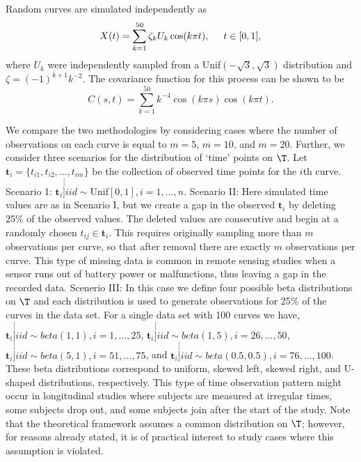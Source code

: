 Random curves are simulated independently as
\begin{equation}
X(t) = \sum^{50}_{k=1}\zeta_k U_k \cos(k\pi t), \hspace{0.5cm} t \in [0,1],
\label{eq:sim process}
\end{equation}
where $U_k$ were independently sampled from a Unif$(-\sqrt{3},\sqrt{3})$ distribution and \(\zeta=(-1)^{k+1}k^{-2}\). 
The covariance function for this process can be shown to be
\begin{equation*}
C(s,t) = \sum^{50}_{k=1}k^{-4} \cos(k\pi s)\cos(k\pi t). 
\end{equation*}

We compare the two methodologies by considering cases where the number of observations on each curve is equal to $m=5$, $m=10$, and $m=20$. Further, we consider three scenarios for the distribution of `time' points on $\T$. Let $\textbf{t}_i = \{t_{i1}, t_{i2}, \dots, t_{im}\}$ be the collection of observed time points for the $i$th curve. Scenario 1: $\textbf{t}_i \stackrel[]{iid}{\sim} \mbox{Unif}[0,1], i = 1, \dots, n$. Scenario II: Here simulated time values are as in Scenario I, but we create a gap in the observed $\textbf{t}_i$ by deleting 25\% of the observed values. The deleted values are consecutive and begin at a randomly chosen $t_{ij} \in \textbf{t}_i$. This requires originally sampling more than $m$ observations per curve, so that after removal there are exactly $m$ observations per curve. This type of missing data is common in remote sensing studies when a sensor runs out of battery power or malfunctions, thus leaving a gap in the recorded data. Scenerio III: In this case we define four possible beta distributions on $\T$ and each distribution is used to generate observations for 25\% of the curves in the data set. For a single data set with 100 curves we have, $\textbf{t}_i \stackrel[]{iid}{\sim}beta(1,1), i = 1, \dots, 25$,  $\textbf{t}_i \stackrel[]{iid}{\sim}beta(1,5), i = 26, \dots, 50$,  $\textbf{t}_i \stackrel[]{iid}{\sim}beta(5,1), i = 51, \dots, 75$,  and $\textbf{t}_i \stackrel[]{iid}{\sim}beta(0.5,0.5), i = 76, \dots, 100$. These beta distributions correspond to uniform, skewed left, skewed right, and U-shaped distributions, respectively. This type of time observation pattern might occur in longitudinal studies where subjects are measured at irregular times, some subjects drop out, and some subjects join after the start of the study. Note that the theoretical framework assumes a common distribution on $\T$; however, for reasons already stated, it is of practical interest to study cases where this assumption is violated.
